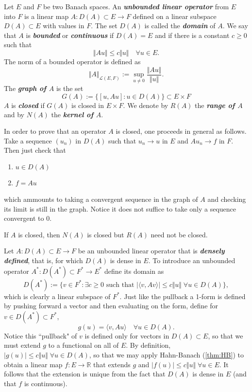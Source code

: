 \documentclass{article}
\theoremstyle{definition}
\numberwithin{equation}{section}
\newcommand{\R}{\mathbb{R}}
\begin{document}
Let  $E$ and $F$ be two Banach spaces. An \textbf{\textit{unbounded linear operator}} from $E$ into $F$ is a linear map $A:D(A)\subset E\to F$ defined on a linear subspace $D(A)\subset E$ with values in $F$. The set $D(A)$ is called the \textbf{\textit{domain}} of $A$. We say that $A$ is \textbf{\textit{bounded}} or \textbf{\textit{continuous}} if $D(A)=E$ and if there is a constant $c\geq0$ such that
\[\Vert Au\Vert\leq c\Vert u\Vert\quad\forall u\in E.\]
The norm of a bounded operator is defined as
\[\Vert A\Vert_{\mathcal{L}(E,F)}:=\sup_{u\neq0}\frac{\Vert Au\Vert}{\Vert u\Vert}.\]
The \textbf{\textit{graph of $A$}} is the set
\[G(A):=\{[u,Au]:u\in D(A)\}\subset E\times F\]
$A$ is \textbf{\textit{closed}} if $G(A)$ is closed in $E\times F$. We denote by $R(A)$ the \textbf{\textit{range of $A$}} and by $N(A)$ the \textbf{\textit{kernel of $A$}}.
\begin{remark}
	In order to prove that an operator $A$ is closed, one proceeds in general as follows. Take a sequence $(u_n)$ in $D(A)$ such that $u_n\to u$ in $E$ and $Au_n\to f$ in $F$. Then just check that
	\begin{enumerate}
		\item $u\in D(A)$
		\item $f=Au$
	\end{enumerate}
	which ammounts to taking a convergent sequence in the graph of $A$ and checking its limit is still in the graph. Notice it does not suffice to take only a sequence convergent to 0.
\end{remark}
\begin{remark}
	If $A$ is closed, then $N(A)$ is closed but $R(A)$ need not be closed.
\end{remark}
Let $A:D(A)\subset E\to F$ be an unbounded linear operator that is \textbf{\textit{densely defined}}, that is, for which $D(A)$ is dense in $E$. To introduce an unbounded operator $A^*:D(A^*)\subset F^*\to E^*$ define its domain as
\[D(A^*):=\{v\in F^*:\exists c\geq0\text{ such that }|\langle v,Av\rangle|\leq c\Vert u \Vert\;\forall u\in D(A)\},\]
which is clearly a linear subspace of $F^*$. Just like the pullback a 1-form is defined by pushing forward a vector and then evaluating on the form, define for $v\in D(A^*)\subset F^*$,
\[g(u)=\langle v,Au\rangle\quad\forall u\in D(A).\]
Notice this ``pullback" of $v$ is defined only for vectors in $D(A)\subset E$, so that we must extend $g$ to a functional on all of $E$. By definition, $|g(u)|\leq c\Vert u\Vert\;\forall u\in D(A)$, so that we may apply Hahn-Banach (\cref{thm:HB}) to obtain a linear map $f:E\to\R$ that extends $g$ and $|f(u)|\leq c\Vert u\Vert\;\forall u\in E$. It follows that the extension is unique from the fact that $D(A)$ is dense in $E$ (and that $f$ is continuous).
\end{document}
